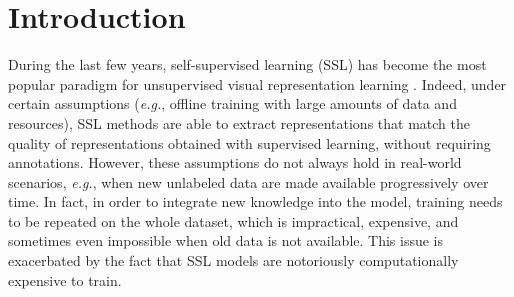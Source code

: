\vspace{-5pt}
\section{Introduction}
\label{sec:intro}
\vspace{-2pt}
During the last few years, self-supervised learning (SSL) has become the most popular paradigm for unsupervised visual representation learning \cite{caron2020unsupervised, caron2021emerging, chen2020simple, he2020momentum, grill2020bootstrap, zbontar2021barlow, bardes2021vicreg, chen2020improved}. Indeed, under certain assumptions (\textit{e.g.}, offline training with large amounts of data and resources), SSL methods are able to extract representations that match the quality of representations obtained with supervised learning, without requiring annotations. However, these assumptions do not always hold in real-world scenarios, \textit{e.g.}, when new unlabeled data are made available progressively over time.
In fact, in order to integrate new knowledge into the model, training needs to be repeated on the whole dataset, which is impractical, expensive, and sometimes even impossible when old data is not available. This issue is exacerbated by the fact that SSL models are notoriously computationally expensive to train.

